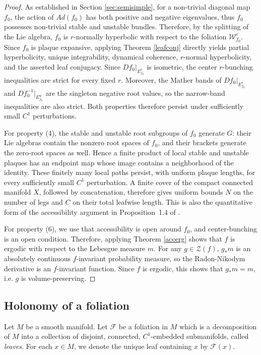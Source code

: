 \documentclass[11pt]{amsart}
\numberwithin{equation}{section}
\theoremstyle{plain}
\begin{document}
\begin{proof}
As established in Section \ref{sec:semisimple}, for a non-trivial diagonal map $f_0$, the action of $Ad(f_0)$ has both positive and negative eigenvalues, thus $f_0$ possesses non-trivial stable and unstable bundles. Therefore, by the splitting of the Lie algebra, $f_0$ is $r$-normally hyperbolic with respect to the foliation $\mathcal{W}^c_{f_0}$. Since $f_0$ is plaque expansive, applying Theorem \ref{leafconj} directly yields partial hyperbolicity, unique integrability, dynamical coherence, $r$-normal hyperbolicity, and the asserted leaf conjugacy.  Since $Df_0|_{E^c_{f_0}}$ is isometric, the center $r$-bunching inequalities are strict for every fixed $r$.  Moreover, the Mather bands of $Df_0|_{E^s_{f_0}}$ and $Df_0^{-1}|_{E^u_{f_0}}$ are the singleton negative root values, so the narrow-band inequalities are also strict.  Both properties therefore persist under sufficiently small $C^1$ perturbations.

For property (4), the stable and unstable root subgroups of
$f_0$ generate $G$: their Lie algebras contain the nonzero root spaces of
$f_0$, and their brackets generate the zero-root spaces as well.  Hence a
finite product of local stable and unstable plaques has an endpoint map
whose image contains a neighborhood of the identity.  These finitely
many local paths persist, with uniform plaque lengths, for every
sufficiently small $C^1$ perturbation.  A finite cover of the compact
connected manifold $X$, followed by concatenation, therefore gives uniform
bounds $N$ on the number of legs and $C$ on their total leafwise length.
This is also the quantitative form of the accessibility argument in
Proposition~1.4 of \cite{GPS}.

For property (6), we use that accessibility is open around $f_0$, and center-bunching is an open condition. Therefore, applying Theorem \ref{accerg} shows that $f$ is ergodic with respect to the Lebesgue measure $m$. For any $g\in \mathcal Z(f)$, $g_*m$ is an absolutely continuous $f$-invariant probability measure, so the Radon-Nikodym derivative is an $f$-invariant function. Since $f$ is ergodic, this shows that $g_*m=m$, i.e. $g$ is volume-preserving.
\end{proof}

 \subsection{Holonomy of a foliation}

Let $M$ be a smooth manifold. Let $\mathcal{F}$ be a foliation in $M$ which is a decomposition of $M$ into a collection of disjoint, connected, $C^1$-embedded submanifolds, called \emph{leaves}. For each $x \in M$, we denote the unique leaf containing $x$ by $\mathcal{F}(x)$. 
\end{document}

